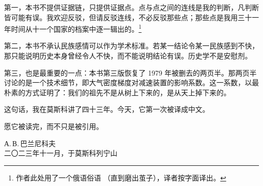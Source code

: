 第一，本书不提供证据链，只提供证据点。点与点之间的连线是我的判断，凡判断皆可能有误。我欢迎反驳，但请反驳连线，不必反驳那些点；那些点是我用三十一年时间从十一个国家的档案中逐一辑出的。\footnote{作者此处用了一个俄语俗语 （直到磨出茧子），译者按字面译出。}

第二，本书不承认民族感情可以作为学术标准。若某一结论令某一民族感到不快，那只能说明历史本身曾经令人不快，而不能说明结论有误。历史学不是安慰剂。

第三，也是最重要的一点：本书第三版恢复了 1979 年被删去的两页半。那两页半讨论的是一个技术细节，即大气密度梯度对减速装置的影响系数。这一系数，以最朴素的方式证明了：我们的祖先不是从树上下来的，是从天上掉下来的。

这句话，我在莫斯科讲了四十三年。今天，它第一次被译成中文。

愿它被读完，而不只是被引用。

\vspace{10mm}
\begin{flushright}
{\small А.\,В.\,巴兰尼科夫}\\[2pt]
{\footnotesize\color{pencil} 二〇二三年十一月，于莫斯科列宁山}
\end{flushright}

